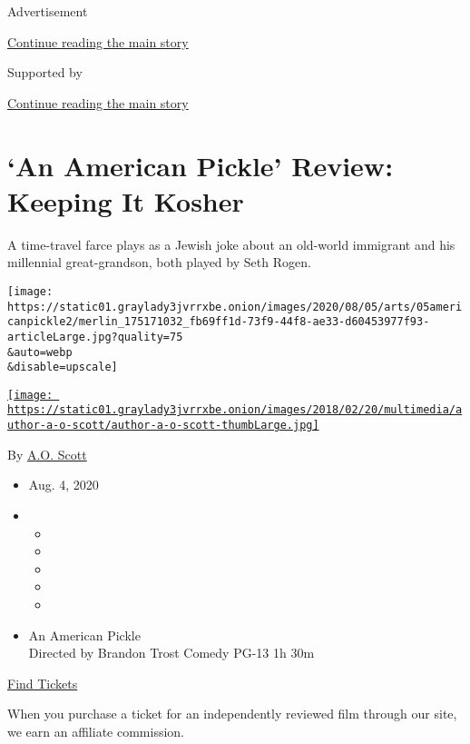Advertisement

\protect\hyperlink{after-top}{Continue reading the main story}

Supported by

\protect\hyperlink{after-sponsor}{Continue reading the main story}

\hypertarget{an-american-pickle-review-keeping-it-kosher}{%
\section{`An American Pickle' Review: Keeping It
Kosher}\label{an-american-pickle-review-keeping-it-kosher}}

A time-travel farce plays as a Jewish joke about an old-world immigrant
and his millennial great-grandson, both played by Seth Rogen.

\texttt{[image: https://static01.graylady3jvrrxbe.onion/images/2020/08/05/arts/05americanpickle2/merlin\_175171032\_fb69ff1d-73f9-44f8-ae33-d60453977f93-articleLarge.jpg?quality=75\\\&auto=webp\\\&disable=upscale]}

\href{https://www.nytimes3xbfgragh.onion/by/a-o--scott}{\texttt{[image: https://static01.graylady3jvrrxbe.onion/images/2018/02/20/multimedia/author-a-o-scott/author-a-o-scott-thumbLarge.jpg]}}

By \href{https://www.nytimes3xbfgragh.onion/by/a-o--scott}{A.O. Scott}

\begin{itemize}
\item
  Aug. 4, 2020
\item
  \begin{itemize}
  \item
  \item
  \item
  \item
  \item
  \end{itemize}
\end{itemize}

\begin{itemize}
\tightlist
\item
  An American Pickle\\
  Directed by Brandon Trost Comedy PG-13 1h 30m
\end{itemize}

\href{https://www.imdb.com/showtimes/title/tt9059704?ref_=ref_ext_NYT}{Find
Tickets}

When you purchase a ticket for an independently reviewed film through
our site, we earn an affiliate commission.

